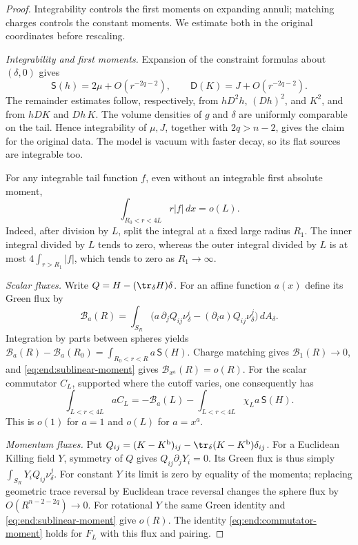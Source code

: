 \begin{proof}
Integrability controls the first moments on expanding annuli; matching
charges controls the constant moments.  We estimate both in the original
coordinates before rescaling.

\emph{Integrability and first moments.} Expansion of the constraint
formulas about $(\delta,0)$ gives
\begin{equation}\label{eq:end:flat-remainders}
 \mathsf S(h)=2\mu+O(r^{-2q-2}),\qquad
 \mathsf D(K)=J+O(r^{-2q-2}).
\end{equation}
The remainder estimates follow, respectively, from
$hD^2h$, $(Dh)^2$, and $K^2$, and from $hDK$ and $Dh\,K$.
The volume densities of $g$ and $\delta$ are uniformly comparable
on the tail.  Hence integrability of $\mu,J$, together with
$2q>n-2$, gives the claim for the original data.  The model is
vacuum with faster decay, so its flat sources are integrable too.

For any integrable tail function $f$, even without an integrable
first absolute moment,
\begin{equation}\label{eq:end:sublinear-moment}
 \int_{R_0<r<4L}r|f|\,dx=o(L).
\end{equation}
Indeed, after division by $L$, split the integral at a fixed large
radius $R_1$.
The inner integral divided by $L$ tends to zero, whereas the
outer integral divided by $L$ is at most
$4\int_{r>R_1}|f|$, which tends to zero as $R_1\to\infty$.

\emph{Scalar fluxes.} Write $Q=H-(\tr_\delta H)\delta$.
For an affine function $a(x)$ define its Green flux by
\[
 \mathcal B_a(R)=\int_{S_R}
 \bigl(a\,\partial_jQ_{ij}\nu^i_\delta
                 -(\partial_i a)Q_{ij}\nu^j_\delta\bigr)\,dA_\delta.
\]
Integration by parts between spheres yields
$\mathcal B_a(R)-\mathcal B_a(R_0)
=\int_{R_0<r<R}a\,\mathsf S(H)$.
Charge matching gives $\mathcal B_1(R)\to0$, and
\eqref{eq:end:sublinear-moment} gives
$\mathcal B_{x^a}(R)=o(R)$.  For the scalar commutator $C_L$, supported where the cutoff varies,
one consequently has
\begin{equation}\label{eq:end:commutator-moment}
 \int_{L<r<4L}a C_L
 =-\mathcal B_a(L)-\int_{L<r<4L}\chi_La\,\mathsf S(H).
\end{equation}
This is $o(1)$ for $a=1$ and $o(L)$ for $a=x^a$.

\emph{Momentum fluxes.} Put
$Q_{ij}=(K-K^{\mathrm b})_{ij}
-\tr_\delta(K-K^{\mathrm b})\delta_{ij}$.
For a Euclidean Killing field $Y$, symmetry of $Q$ gives
$Q_{ij}\partial_jY_i=0$.  Its Green flux is thus simply
$\int_{S_R}Y_iQ_{ij}\nu^j_\delta$.
For constant $Y$ its limit is zero by equality of the momenta;
replacing geometric trace reversal by Euclidean trace reversal
changes the sphere flux by $O(R^{n-2-2q})\to0$.
For rotational $Y$ the same Green identity and
\eqref{eq:end:sublinear-moment} give $o(R)$.
The identity \eqref{eq:end:commutator-moment} holds for $F_L$
with this flux and pairing.


\end{proof}
